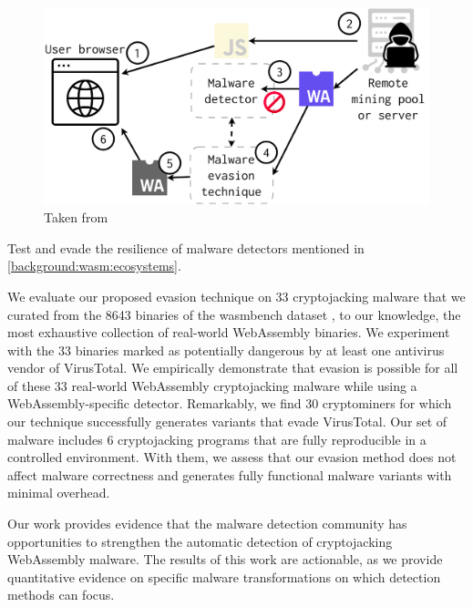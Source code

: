 
\begin{figure}
    \centering
    \includegraphics[width=0.8\linewidth]{figures/threat_model.pdf}
    \caption{Taken from \cite{EVASION}}
    \label{fig:threat_model}
\end{figure}

Test and evade the resilience of \Wasm malware detectors mentioned in \autoref{background:wasm:ecosystems}.




We evaluate our proposed evasion technique on 33 cryptojacking malware that we curated from the 8643 binaries of the wasmbench dataset \cite{Hilbig2021AnES}, to our knowledge, the most exhaustive collection of real-world WebAssembly binaries.
We experiment with the 33 binaries marked as potentially dangerous by at least one antivirus vendor of VirusTotal.
We empirically demonstrate that evasion is possible for all of these 33 real-world WebAssembly cryptojacking malware while using a WebAssembly-specific detector. 
Remarkably, we find 30 cryptominers for which our technique successfully generates variants that evade VirusTotal.
Our set of malware includes 6 cryptojacking programs that are fully reproducible in a controlled environment. 
With them, we assess that our evasion method does not affect malware correctness and generates fully functional malware variants with minimal overhead.

Our work provides evidence that the malware detection community has opportunities to strengthen the automatic detection of cryptojacking WebAssembly malware. 
The results of this work are actionable, as we provide quantitative evidence on specific malware transformations on which detection methods can focus.


